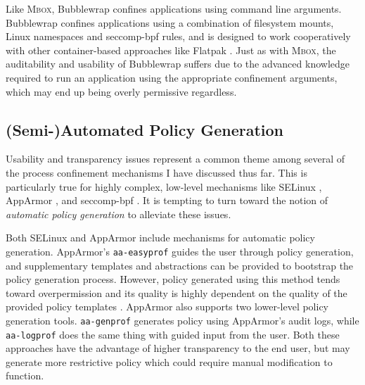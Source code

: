 \documentclass[dvipsnames, 12pt]{article}
\newcommand{\kimmbox}{\textsc{Mbox}}
\begin{document}
Like \kimmbox{}, Bubblewrap \cite{bubblewrap} confines applications using
command line arguments. Bubblewrap confines applications using a combination of
filesystem mounts, Linux namespaces and seccomp-bpf rules, and is designed to
work cooperatively with other container-based approaches like Flatpak
\cite{flatpak}. Just as with \kimmbox{}, the auditability and usability of
Bubblewrap suffers due to the advanced knowledge required to run an application
using the appropriate confinement arguments, which may end up being overly
permissive regardless.

\subsection{(Semi-)Automated Policy Generation}

Usability and transparency issues represent a common theme among several of the
process confinement mechanisms I have discussed thus far. This is particularly
true for highly complex, low-level mechanisms like SELinux
\cite{smalley2001_selinux}, AppArmor \cite{cowan2000_apparmor}, and seccomp-bpf
\cite{drewry2012_seccomp_bpf,seccomp_bpf}. It is tempting to turn toward the
notion of \textit{automatic policy generation} to alleviate these issues.

Both SELinux and AppArmor include mechanisms for automatic policy generation.
AppArmor's \texttt{aa-easyprof} \cite{aa_easyprof} guides the user through
policy generation, and supplementary templates and abstractions can be provided
to bootstrap the policy generation process. However, policy generated using this
method tends toward overpermission and its quality is highly dependent on the
quality of the provided policy templates \cite{aa_easyprof}.  AppArmor also
supports two lower-level policy generation tools.  \texttt{aa-genprof}
\cite{aa_genprof} generates policy using AppArmor's audit logs, while
\texttt{aa-logprof} \cite{aa_logprof} does the same thing with guided input from
the user. Both these approaches have the advantage of higher transparency to the
end user, but may generate more restrictive policy which could require manual
modification to function.
\end{document}
